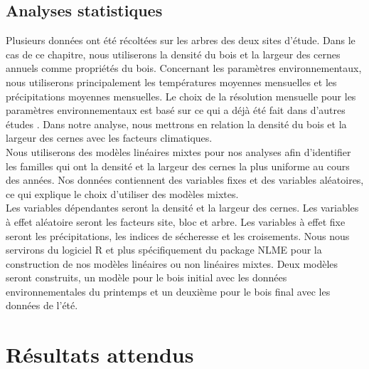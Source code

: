 \documentclass{report}
\begin{document}
\subsection*{Analyses statistiques}
Plusieurs données ont été récoltées sur les arbres des deux sites d'étude. Dans le cas de ce chapitre, nous utiliserons la densité du bois et la largeur des cernes annuels comme propriétés du bois. Concernant les paramètres environnementaux, nous utiliserons principalement les températures moyennes mensuelles et les précipitations moyennes mensuelles. Le choix de la résolution mensuelle pour les paramètres environnementaux est basé sur ce qui a déjà été fait dans d'autres études \citep{Franceschini2017}. Dans notre analyse, nous mettrons en relation la densité du bois et la largeur des cernes avec les facteurs climatiques. \\

Nous utiliserons des modèles linéaires mixtes pour nos analyses afin d'identifier les familles qui ont la densité et la largeur des cernes la plus uniforme au cours des années. Nos données contiennent des variables fixes et des variables aléatoires, ce qui explique le choix d'utiliser des modèles mixtes.\\ %

Les variables dépendantes seront la densité et la largeur des cernes. Les variables à effet aléatoire seront les facteurs site, bloc et arbre. Les variables à effet fixe seront les précipitations, les indices de sécheresse et les croisements. Nous nous servirons du logiciel R \citep{R2018} et plus spécifiquement du package NLME \citep{NLME2018} pour la construction de nos modèles linéaires ou non linéaires mixtes. %
Deux modèles seront construits, un modèle pour le bois initial avec les données environnementales du printemps et un deuxième pour le bois final avec les données de l'été.


\section{Résultats attendus}
\end{document}
